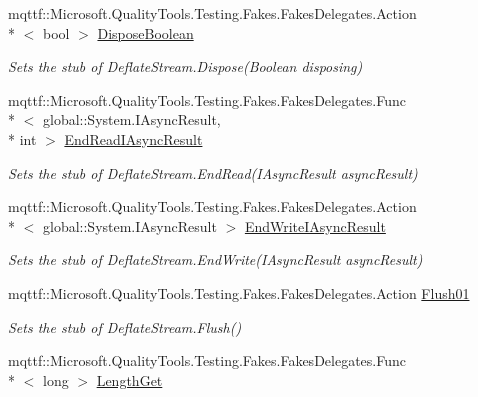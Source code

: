 \begin{DoxyCompactItemize}
mqttf\-::\-Microsoft.\-Quality\-Tools.\-Testing.\-Fakes.\-Fakes\-Delegates.\-Action\\*
$<$ bool $>$ \hyperlink{class_system_1_1_i_o_1_1_compression_1_1_fakes_1_1_stub_deflate_stream_accb9e0c3f7e3ecc4d50aaa953e8973e9}{Dispose\-Boolean}
\begin{DoxyCompactList}\small\item\em Sets the stub of Deflate\-Stream.\-Dispose(\-Boolean disposing)\end{DoxyCompactList}\item 
mqttf\-::\-Microsoft.\-Quality\-Tools.\-Testing.\-Fakes.\-Fakes\-Delegates.\-Func\\*
$<$ global\-::\-System.\-I\-Async\-Result, \\*
int $>$ \hyperlink{class_system_1_1_i_o_1_1_compression_1_1_fakes_1_1_stub_deflate_stream_a56c43549a7c85b4b146dd845a9094c71}{End\-Read\-I\-Async\-Result}
\begin{DoxyCompactList}\small\item\em Sets the stub of Deflate\-Stream.\-End\-Read(\-I\-Async\-Result async\-Result)\end{DoxyCompactList}\item 
mqttf\-::\-Microsoft.\-Quality\-Tools.\-Testing.\-Fakes.\-Fakes\-Delegates.\-Action\\*
$<$ global\-::\-System.\-I\-Async\-Result $>$ \hyperlink{class_system_1_1_i_o_1_1_compression_1_1_fakes_1_1_stub_deflate_stream_a8b3027ee4c0680f244abebb50a881215}{End\-Write\-I\-Async\-Result}
\begin{DoxyCompactList}\small\item\em Sets the stub of Deflate\-Stream.\-End\-Write(\-I\-Async\-Result async\-Result)\end{DoxyCompactList}\item 
mqttf\-::\-Microsoft.\-Quality\-Tools.\-Testing.\-Fakes.\-Fakes\-Delegates.\-Action \hyperlink{class_system_1_1_i_o_1_1_compression_1_1_fakes_1_1_stub_deflate_stream_ae5b0247a5718799c25f69a57be67bce0}{Flush01}
\begin{DoxyCompactList}\small\item\em Sets the stub of Deflate\-Stream.\-Flush()\end{DoxyCompactList}\item 
mqttf\-::\-Microsoft.\-Quality\-Tools.\-Testing.\-Fakes.\-Fakes\-Delegates.\-Func\\*
$<$ long $>$ \hyperlink{class_system_1_1_i_o_1_1_compression_1_1_fakes_1_1_stub_deflate_stream_a5bb0262d260d8abe3d7e886b3a9f7a46}{Length\-Get}

\end{DoxyCompactItemize}
